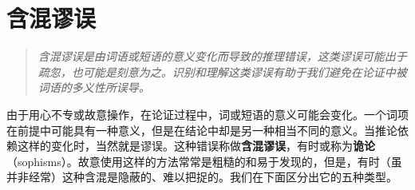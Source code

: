 \section{含混谬误}

\begin{quotation}
\textit{含混谬误是由词语或短语的意义变化而导致的推理错误，这类谬误可能出于疏忽，也可能是刻意为之。识别和理解这类谬误有助于我们避免在论证中被词语的多义性所误导。}
\end{quotation}

由于用心不专或故意操作，在论证过程中，词或短语的意义可能会变化。一个词项在前提中可能具有一种意义，但是在结论中却是另一种相当不同的意义。当推论依赖这样的变化时，当然就是谬误。这种错误称做\textbf{含混谬误}，有时或称为\textbf{诡论}（sophisms）。故意使用这样的方法常常是粗糙的和易于发现的，但是，有时（虽并非经常）这种含混是隐蔽的、难以把捉的。我们在下面区分出它的五种类型。 